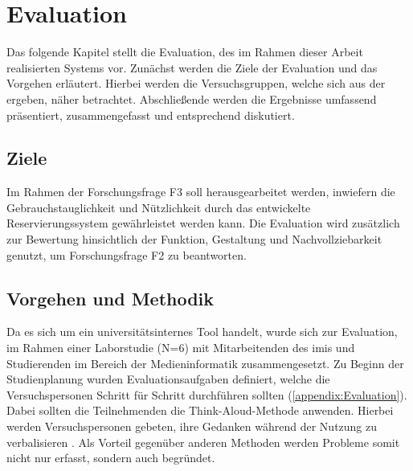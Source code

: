 

\chapter{Evaluation}
\label{chapter-evaluation}
Das folgende Kapitel stellt die Evaluation, des im Rahmen dieser Arbeit
realisierten Systems vor. Zunächst werden die Ziele der Evaluation und das
Vorgehen erläutert. Hierbei werden die Versuchsgruppen, welche sich aus der
 ergeben, näher betrachtet. Abschließende werden die
Ergebnisse umfassend präsentiert, zusammengefasst und entsprechend diskutiert.

\section{Ziele}
Im Rahmen der Forschungsfrage F3 soll herausgearbeitet werden, inwiefern die
Gebrauchstauglichkeit und Nützlichkeit durch das entwickelte Reservierungssystem
gewährleistet werden kann. Die Evaluation wird zusätzlich zur Bewertung
hinsichtlich der Funktion, Gestaltung und Nachvollziebarkeit genutzt, um
Forschungsfrage F2 zu beantworten.


\section{Vorgehen und Methodik}
Da es sich um ein universitätsinternes Tool handelt, wurde sich zur Evaluation,
im Rahmen einer Laborstudie (N=6) mit Mitarbeitenden des \ac{imis} und
Studierenden im Bereich der Medieninformatik zusammengesetzt. Zu Beginn der
Studienplanung wurden Evaluationsaufgaben definiert, welche die Versuchspersonen
Schritt für Schritt durchführen sollten (\ref{appendix:Evaluation}). Dabei
sollten die Teilnehmenden die Think-Aloud-Methode anwenden. Hierbei werden
Versuchspersonen gebeten, ihre Gedanken während der Nutzung zu verbalisieren
\cite{nielsen_usability_1994}. Als Vorteil gegenüber anderen Methoden werden
Probleme somit nicht nur erfasst, sondern auch begründet\cite{nielsen_think}.

